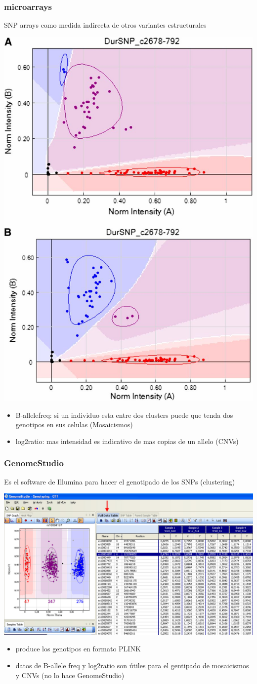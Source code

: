 \documentclass{beamer}\usepackage[]{graphicx}\usepackage[]{color}
\begin{document}
\begin{frame}[fragile] 
\frametitle{microarrays}

SNP arrays como medida indirecta de otros variantes estructurales
\begin{center}
\includegraphics[width=0.3\linewidth]{clustermicro.jpg}
\end{center}

\begin{itemize}
\item B-allelefreq: si un individuo esta entre dos clusters puede que tenda dos genotipos en sus celulas (Mosaicismos) 
\item log2ratio: mas intensidad es indicativo de mas copias de un allelo (CNVs)
\end{itemize}

\end{frame}



\begin{frame}[fragile]
\frametitle{GenomeStudio}
Es el software de Illumina para hacer el genotipado de los SNPs (clustering)
\newline
\begin{center}
\includegraphics[width=0.5\linewidth]{genomestudio.jpg}
\end{center}

\begin{itemize}
\item produce los genotipos en formato PLINK 
\item datos de B-allele freq y log2ratio son \'utiles para el gentipado de mosaicismos y CNVs (no lo hace GenomeStudio)
\end{itemize}

\end{frame}
\end{document}
